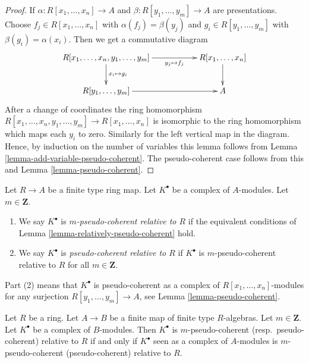 \begin{proof}
If $\alpha : R[x_1, \ldots, x_n] \to A$ and
$\beta : R[y_1, \ldots, y_m] \to A$ are presentations.
Choose $f_j \in R[x_1, \ldots, x_n]$ with $\alpha(f_j) = \beta(y_j)$
and $g_i \in R[y_1, \ldots, y_m]$ with $\beta(g_i) = \alpha(x_i)$.
Then we get a commutative diagram
$$
\xymatrix{
R[x_1, \ldots, x_n, y_1, \ldots, y_m]
\ar[d]^{x_i \mapsto g_i} \ar[rr]_-{y_j \mapsto f_j} & &
R[x_1, \ldots, x_n] \ar[d] \\
R[y_1, \ldots, y_m] \ar[rr] & & A
}
$$
After a change of coordinates the ring homomorphism
$R[x_1, \ldots, x_n, y_1, \ldots, y_m] \to R[x_1, \ldots, x_n]$
is isomorphic to the ring homomorphism which maps
each $y_i$ to zero. Similarly for the left vertical map in the
diagram. Hence, by induction on the number of variables this lemma follows from
Lemma \ref{lemma-add-variable-pseudo-coherent}.
The pseudo-coherent case follows from this and
Lemma \ref{lemma-pseudo-coherent}.
\end{proof}

\begin{definition}
\label{definition-relatively-pseudo-coherent}
Let $R \to A$ be a finite type ring map.
Let $K^\bullet$ be a complex of $A$-modules.
Let $m \in \mathbf{Z}$.
\begin{enumerate}
\item We say $K^\bullet$ is {\it $m$-pseudo-coherent relative to $R$}
if the equivalent conditions of
Lemma \ref{lemma-relatively-pseudo-coherent}
hold.
\item We say $K^\bullet$ is {\it pseudo-coherent relative to $R$}
if $K^\bullet$ is $m$-pseudo-coherent relative to $R$ for all
$m \in \mathbf{Z}$.
\end{enumerate}
\end{definition}

\noindent
Part (2) means that $K^\bullet$ is pseudo-coherent as a complex
of $R[x_1, \ldots, x_n]$-modules for any surjection
$R[y_1, \ldots, y_m] \to A$, see
Lemma \ref{lemma-pseudo-coherent}.

\begin{lemma}
\label{lemma-finite-extension-pseudo-coherent}
Let $R$ be a ring. Let $A \to B$ be a finite map of finite type $R$-algebras.
Let $m \in \mathbf{Z}$. Let $K^\bullet$ be a complex of $B$-modules.
Then $K^\bullet$ is $m$-pseudo-coherent (resp.\ pseudo-coherent)
relative to $R$ if and only if $K^\bullet$ seen as a complex of $A$-modules
is $m$-pseudo-coherent (pseudo-coherent) relative to $R$.
\end{lemma}

